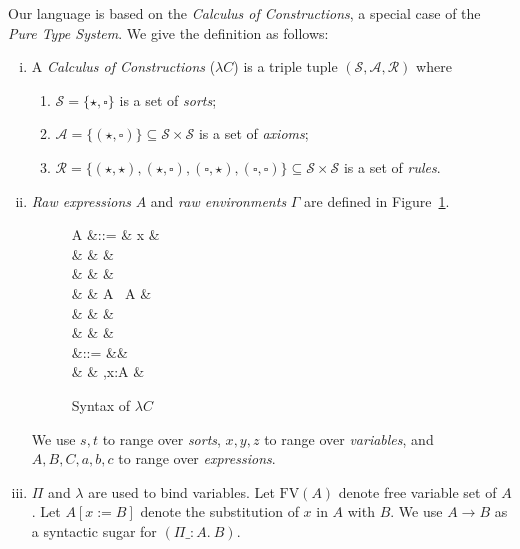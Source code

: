Our language is based on the \emph{Calculus of Constructions}, a
special case of the \emph{Pure Type System}. We give the definition as
follows:

\begin{enumerate}[(i)]
\item A \emph{Calculus of Constructions} ($\lambda C$) is a triple
  tuple $(\mathcal{S},\mathcal{A},\mathcal{R})$ where

  \begin{enumerate}
  \item $\mathcal{S} = \{\star,\square\}$ is a set of \emph{sorts};
  \item
    $\mathcal{A} = \{(\star, \square)\} \subseteq \mathcal{S} \times
    \mathcal{S}$ is a set of \emph{axioms};
  \item
    $\mathcal{R} = \{(\star, \star), (\star, \square), (\square,
    \star), (\square, \square)\}\subseteq \mathcal{S} \times
    \mathcal{S}$ is a set of \emph{rules}.
  \end{enumerate}

\item \emph{Raw expressions} $A$ and \emph{raw environments} $\Gamma$
  are defined in Figure~\ref{fig:cocsyn}.

\begin{figure}[ht]
\small
\begin{syntax}
  A &::= & x &  \\
  & \mid & \star &  \\
  & \mid & \square &  \\
  & \mid & A \ A &  \\
  & \mid &  &  \\
  & \mid &  &  \\
  \Gamma &::= &\varnothing &  \\
  & \mid & \Gamma,x:A & 
\end{syntax}
\caption{Syntax of $\lambda C$}\label{fig:cocsyn}
\end{figure}
We use $s,t$ to range over \emph{sorts}, $x,y,z$ to range over
\emph{variables}, and $A,B,C,a,b,c$ to range over \emph{expressions}.

\item $\Pi$ and $\lambda$ are used to bind variables. Let
  $\mathrm{FV}(A)$ denote free variable set of $A$. Let $A[x:=B]$
  denote the substitution of $x$ in $A$ with $B$. We use $A \to B$ as
  a syntactic sugar for $(\Pi \_:A.\ B)$.


\end{enumerate}
